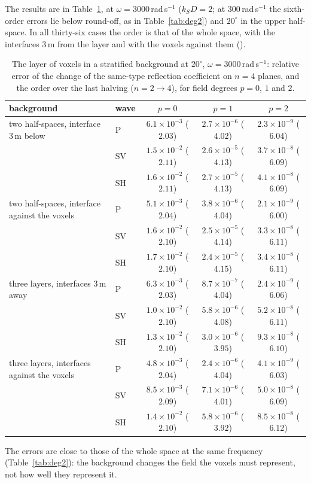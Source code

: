 \documentclass[11pt,a4paper]{article}
\begin{document}
The results are in Table~\ref{tab:strat}, at $\omega=3000$\,rad\,s$^{-1}$ ($k_SD=2$; at
$300$\,rad\,s$^{-1}$ the sixth-order errors lie below round-off, as in Table~\ref{tab:deg2}) and
$20^\circ$ in the upper half-space. In all thirty-six cases the order is that of the whole space, with
the interfaces $3$\,m from the layer and with the voxels against them
().
\begin{table}[htbp]
\centering
\caption{The layer of voxels in a stratified background at $20^\circ$, $\omega=3000$\,rad\,s$^{-1}$:
relative error of the change of the same-type reflection coefficient on $n=4$ planes, and the order
over the last halving ($n=2\to4$), for field degrees $p=0$, $1$ and $2$.}\label{tab:strat}
\small\setlength{\tabcolsep}{4pt}
\begin{tabular}{@{}llccc@{}}
\toprule
background & wave & $p=0$ & $p=1$ & $p=2$ \\
\midrule
two half-spaces, interface $3$\,m below
 & P  & $6.1\times10^{-3}$ ($2.03$) & $2.7\times10^{-6}$ ($4.02$) & $2.3\times10^{-9}$ ($6.04$) \\
 & SV & $1.5\times10^{-2}$ ($2.11$) & $2.6\times10^{-5}$ ($4.13$) & $3.7\times10^{-8}$ ($6.09$) \\
 & SH & $1.6\times10^{-2}$ ($2.11$) & $2.7\times10^{-5}$ ($4.13$) & $4.1\times10^{-8}$ ($6.09$) \\
two half-spaces, interface against the voxels
 & P  & $5.1\times10^{-3}$ ($2.04$) & $3.8\times10^{-6}$ ($4.04$) & $2.1\times10^{-9}$ ($6.00$) \\
 & SV & $1.6\times10^{-2}$ ($2.10$) & $2.5\times10^{-5}$ ($4.14$) & $3.3\times10^{-8}$ ($6.11$) \\
 & SH & $1.7\times10^{-2}$ ($2.10$) & $2.4\times10^{-5}$ ($4.15$) & $3.4\times10^{-8}$ ($6.11$) \\
three layers, interfaces $3$\,m away
 & P  & $6.3\times10^{-3}$ ($2.03$) & $8.7\times10^{-7}$ ($4.04$) & $2.4\times10^{-9}$ ($6.06$) \\
 & SV & $1.0\times10^{-2}$ ($2.10$) & $5.8\times10^{-6}$ ($4.08$) & $5.2\times10^{-8}$ ($6.11$) \\
 & SH & $1.3\times10^{-2}$ ($2.10$) & $3.0\times10^{-6}$ ($3.95$) & $9.3\times10^{-8}$ ($6.10$) \\
three layers, interfaces against the voxels
 & P  & $4.8\times10^{-3}$ ($2.04$) & $2.4\times10^{-6}$ ($4.04$) & $4.1\times10^{-9}$ ($6.03$) \\
 & SV & $8.5\times10^{-3}$ ($2.09$) & $7.1\times10^{-6}$ ($4.01$) & $5.0\times10^{-8}$ ($6.09$) \\
 & SH & $1.4\times10^{-2}$ ($2.10$) & $5.8\times10^{-6}$ ($3.92$) & $8.5\times10^{-8}$ ($6.12$) \\
\bottomrule
\end{tabular}
\end{table}
The errors are close to those of the whole space at the same frequency (Table~\ref{tab:deg2}): the
background changes the field the voxels must represent, not how well they represent it. 
\end{document}
